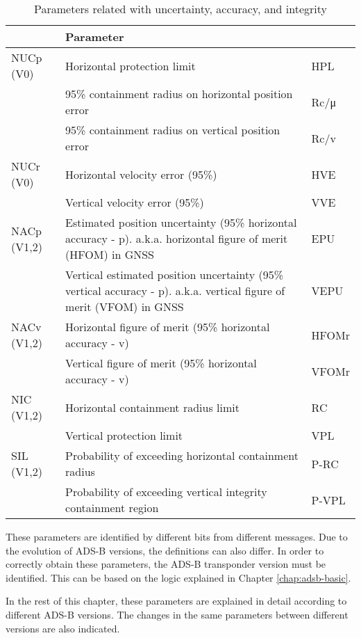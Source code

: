 \begin{table}[ht]
\caption{Parameters related with uncertainty, accuracy, and integrity}
\label{tb:uncertainty-parameters}
\begin{tabular}{|l|p{8cm}|l|}
\hline
\textbf{} & \textbf{Parameter} &  \\ \hline
NUCp (V0) & Horizontal protection limit & HPL \\ \cline{2-3}
 & 95\% containment radius on horizontal position error & Rc/μ \\ \cline{2-3}
 & 95\% containment radius on vertical position error & Rc/v \\ \hline
NUCr (V0) & Horizontal velocity error (95\%) & HVE \\ \cline{2-3}
 & Vertical velocity error (95\%) & VVE \\ \hline
NACp (V1,2) & Estimated position uncertainty (95\% horizontal accuracy - p). a.k.a. horizontal figure of merit (HFOM) in GNSS & EPU \\ \cline{2-3}
 & Vertical estimated position uncertainty (95\% vertical accuracy - p). a.k.a. vertical figure of merit (VFOM) in GNSS & VEPU \\ \hline
NACv (V1,2) & Horizontal figure of merit (95\% horizontal accuracy - v) & HFOMr \\ \cline{2-3}
 & Vertical figure of merit (95\% horizontal accuracy - v) & VFOMr \\ \hline
NIC (V1,2) & Horizontal containment radius limit & RC \\ \cline{2-3}
 & Vertical protection limit & VPL \\ \hline
SIL (V1,2) & Probability of exceeding horizontal containment radius & P-RC \\ \cline{2-3}
 & Probability of exceeding vertical integrity containment region & P-VPL \\ \hline
\end{tabular}
\end{table}

These parameters are identified by different bits from different messages. Due to the evolution of ADS-B versions, the definitions can also differ. In order to correctly obtain these parameters, the ADS-B transponder version must be identified. This can be based on the logic explained in Chapter \ref{chap:adsb-basic}.

In the rest of this chapter, these parameters are explained in detail according to different ADS-B versions. The changes in the same parameters between different versions are also indicated.


